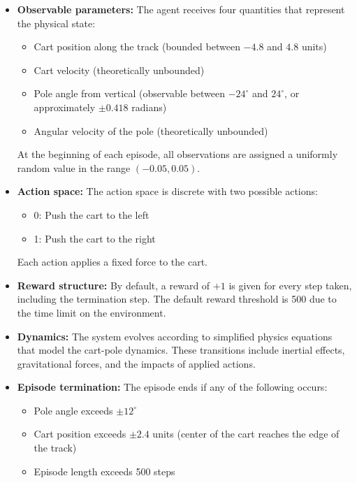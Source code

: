 \documentclass{article}
\begin{document}
\begin{itemize}
    \item \textbf{Observable parameters:} The agent receives four quantities that represent the physical state:
    \begin{itemize}
        \item Cart position along the track (bounded between $-4.8$ and $4.8$ units)
        \item Cart velocity (theoretically unbounded)
        \item Pole angle from vertical (observable between $-24^\circ$ and $24^\circ$, or approximately $\pm 0.418$ radians)
        \item Angular velocity of the pole (theoretically unbounded)
    \end{itemize}
    At the beginning of each episode, all observations are assigned a uniformly random value in the range $(-0.05, 0.05)$.
    
    \item \textbf{Action space:} The action space is discrete with two possible actions:
    \begin{itemize}
        \item 0: Push the cart to the left
        \item 1: Push the cart to the right
    \end{itemize}
    Each action applies a fixed force to the cart.
    
    \item \textbf{Reward structure:} By default, a reward of $+1$ is given for every step taken, including the termination step. The default reward threshold is 500 due to the time limit on the environment.
    
    \item \textbf{Dynamics:} The system evolves according to simplified physics equations that model the cart-pole dynamics. These transitions include inertial effects, gravitational forces, and the impacts of applied actions.
    
    \item \textbf{Episode termination:} The episode ends if any of the following occurs:
    \begin{itemize}
        \item Pole angle exceeds $\pm 12^\circ$
        \item Cart position exceeds $\pm 2.4$ units (center of the cart reaches the edge of the track)
        \item Episode length exceeds 500 steps
    \end{itemize}
\end{itemize}
\end{document}
